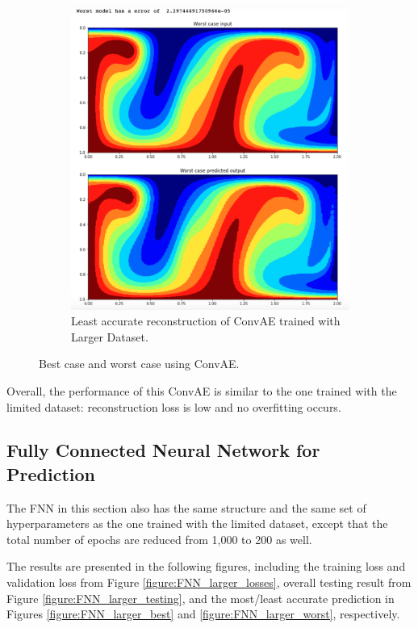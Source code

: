 \begin{figure}[H]
\begin{subfigure}{0.45\textwidth}
    \includegraphics[width=\textwidth]{figures/mantle_convection_images/larger_dataset/ConvAE_Worst.png}
    \caption{Least accurate reconstruction of ConvAE trained with Larger Dataset.}
\end{subfigure}   
\caption{Best case and worst case using ConvAE.}
\label{figure:ConvAE_larger_best_worst}
\end{figure}

Overall, the performance of this ConvAE is similar to the one trained with the limited dataset: reconstruction loss is low and no overfitting occurs.


\subsection{Fully Connected Neural Network for Prediction}

The FNN in this section also has the same structure and the same set of hyperparameters as the one trained with the limited dataset, except that the total number of epochs are reduced from 1,000 to 200 as well.

The results are presented in the following figures, including the training loss and validation loss from Figure \ref{figure:FNN_larger_losses}, overall testing result from Figure \ref{figure:FNN_larger_testing}, and the most/least accurate prediction in Figures \ref{figure:FNN_larger_best} and \ref{figure:FNN_larger_worst}, respectively.

